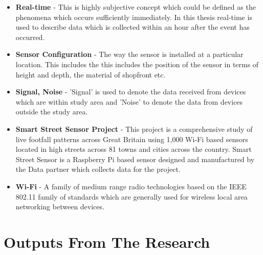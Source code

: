\begin{itemize}
  \item \textbf{Real-time} - This is highly subjective concept which could be defined as the phenomena which occurs sufficiently immediately. In this thesis real-time is used to describe data which is collected within an hour after the event has occurred.

  \item \textbf{Sensor Configuration} - The way the sensor is installed at a particular location. This includes the this includes the position of the sensor in terms of height and depth, the material of shopfront etc.

  \item \textbf{Signal, Noise} - 'Signal' is used to denote the data received from devices which are within study area and 'Noise' to denote the data from devices outside the study area.

  \item \textbf{Smart Street Sensor Project} - This project is a comprehensive study of live footfall patterns across Great Britain using 1,000 Wi-Fi based sensors located in high streets across 81 towns and cities across the country. Smart Street Sensor is a Raspberry Pi based sensor designed and manufactured by the Data partner which collects data for the project.

  \item \textbf{Wi-Fi} - A family of medium range radio technologies based on the IEEE 802.11 family of standards which are generally used for wireless local area networking between devices.

\end{itemize}


\chapter*{Outputs From The Research} \label{front:outputs}

